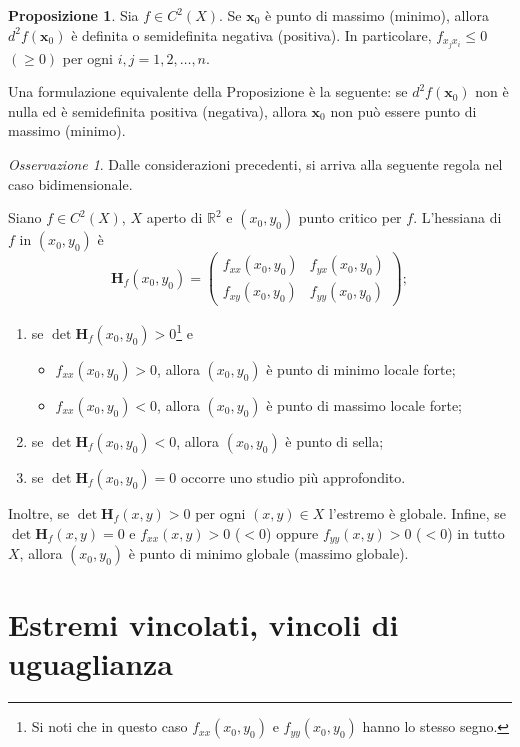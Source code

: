 \documentclass[a4paper]{book}
\numberwithin{equation}{section}
\theoremstyle{plain}
\theoremstyle{definition}
\newtheorem{prop}{Proposizione}[section]
\theoremstyle{remark}
\newtheorem{oss}{Osservazione}[section]
\renewcommand{\vec}{\boldsymbol}
\theoremstyle{example}
\begin{document}
	\begin{prop}
		Sia $f \in C^2(X)$. Se $\vec{x}_0$ è punto di massimo (minimo), allora $d^2f(\vec{x}_0)$ è definita o semidefinita negativa (positiva). In particolare, $f_{x_jx_i} \le 0$ $(\ge 0)$ per ogni $i,j = 1, 2, \dots, n$.
	\end{prop}

	Una formulazione equivalente della Proposizione è la seguente: se $d^2f(\vec{x}_0)$ non è nulla ed è semidefinita positiva (negativa), allora $\vec{x}_0$ non può essere punto di massimo (minimo).

	\begin{oss} Dalle considerazioni precedenti, si arriva alla seguente regola nel caso bidimensionale.

		Siano $f \in C^2(X)$, $X$ aperto di $\mathbb{R}^2$ e $(x_0, y_0)$ punto critico per $f$. L'hessiana di $f$ in $(x_0, y_0)$ è
		\begin{equation*}
			\mathbf{H}_f(x_0, y_0) = \begin{pmatrix} f_{xx}(x_0, y_0) & f_{yx}(x_0, y_0) \\ f_{xy}(x_0, y_0) & f_{yy}(x_0, y_0) \end{pmatrix};
		\end{equation*}
		\begin{enumerate}
			\item se $\det{\mathbf{H}_f(x_0, y_0)} > 0$\footnote{Si noti che in questo caso $f_{xx}(x_0, y_0)$ e $f_{yy}(x_0, y_0)$ hanno lo stesso segno.} e
			\begin{itemize}
				\item $f_{xx}(x_0, y_0) > 0$, allora $(x_0, y_0)$ è punto di minimo locale forte;
				\item $f_{xx}(x_0, y_0) < 0$, allora $(x_0, y_0)$ è punto di massimo locale forte;
			\end{itemize}
			\item se $\det{\mathbf{H}_f(x_0, y_0)} < 0$, allora $(x_0, y_0)$ è punto di sella;
			\item se $\det{\mathbf{H}_f(x_0, y_0)} = 0$ occorre uno studio più approfondito.
		\end{enumerate}
		Inoltre, se $\det{\mathbf{H}_f(x, y)} > 0$ per ogni $(x, y) \in X$ l'estremo è globale. Infine, se $\det{\mathbf{H}_f(x, y)} = 0$ e $f_{xx}(x,y) > 0$ ($< 0$) oppure $f_{yy}(x,y) > 0$ ($< 0$) in tutto $X$, allora $(x_0, y_0)$ è punto di minimo globale (massimo globale).
	\end{oss}

	\section{Estremi vincolati, vincoli di uguaglianza}
\end{document}
